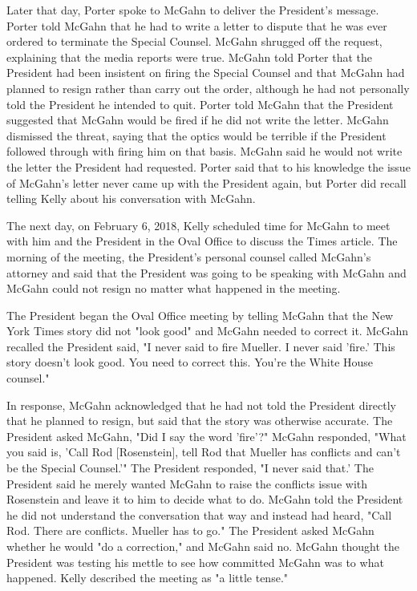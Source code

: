 Later that day, Porter spoke to McGahn to deliver the President's message.%
Porter told McGahn that he had to write a letter to dispute that he was ever ordered to terminate the Special Counsel.%
McGahn shrugged off the request, explaining that the media reports were true.%
McGahn told Porter that the President had been insistent on firing the Special Counsel and that McGahn had planned to resign rather than carry out the order, although he had not personally told the President he intended to quit.%
Porter told McGahn that the President suggested that McGahn would be fired if he did not write the letter.%
McGahn dismissed the threat, saying that the optics would be terrible if the President followed through with firing him on that basis.%
McGahn said he would not write the letter the President had requested.%
Porter said that to his knowledge the issue of McGahn's letter never came up with the President again, but Porter did recall telling Kelly about his conversation with McGahn.%

The next day, on February 6, 2018, Kelly scheduled time for McGahn to meet with him and the President in the Oval Office to discuss the Times article.%
The morning of the meeting, the President's personal counsel called McGahn's attorney and said that the President was going to be speaking with McGahn and McGahn could not resign no matter what happened in the meeting.%

The President began the Oval Office meeting by telling McGahn that the New York Times story did not "look good" and McGahn needed to correct it.%
McGahn recalled the President said, "I never said to fire Mueller.
I never said 'fire.'
This story doesn't look good.
You need to correct this.
You're the White House counsel."%

In response, McGahn acknowledged that he had not told the President directly that he planned to resign, but said that the story was otherwise accurate.%
The President asked McGahn, "Did I say the word 'fire'?"%
McGahn responded, "What you said is, 'Call Rod [Rosenstein], tell Rod that Mueller has conflicts and can't be the Special Counsel.'"%
The President responded, "I never said that.'%
The President said he merely wanted McGahn to raise the conflicts issue with Rosenstein and leave it to him to decide what to do.%
McGahn told the President he did not understand the conversation that way and instead had heard, "Call Rod.
There are conflicts.
Mueller has to go."%
The President asked McGahn whether he would "do a correction," and McGahn said no.%
McGahn thought the President was testing his mettle to see how committed McGahn was to what happened.%
Kelly described the meeting as "a little tense."%

